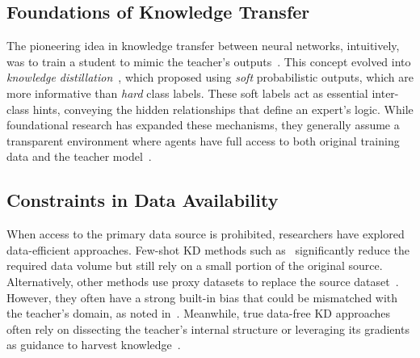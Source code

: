 \subsection{Foundations of Knowledge Transfer} \label{ssec:02-related-kd}
\begin{foldable} %
  The pioneering idea in knowledge transfer between neural networks, intuitively, was to train a student to mimic the teacher's outputs~\cite{bucila2006model}.
  This concept evolved into \textit{knowledge distillation}~\cite{hinton2015distilling}, which proposed using \textit{soft} probabilistic outputs, which are more informative than \textit{hard} class labels.
  These soft labels act as essential inter-class hints, conveying the hidden relationships that define an expert's logic.
  While foundational research has expanded these mechanisms, they generally assume a transparent environment where agents have full access to both original training data and the teacher model~\cite{romero2015fitnets, nguyen2021knowledge}.
\end{foldable}

\subsection{Constraints in Data Availability} \label{ssec:02-related-dfkd}
\begin{foldable} %
  When access to the primary data source is prohibited, researchers have explored data-efficient approaches.
  Few-shot KD methods such as~\cite{wang2020neural, nguyen2022black, vo2024improving} significantly reduce the required data volume but still rely on a small portion of the original source.
  Alternatively, other methods use proxy datasets to replace the source dataset~\cite{chen2021learning, tang2023distribution}.
  However, they often have a strong built-in bias that could be mismatched with the teacher's domain, as noted in~\cite{torralba2011unbiased}.
  Meanwhile, true data-free KD approaches often rely on dissecting the teacher's internal structure or leveraging its gradients as guidance to harvest knowledge~\cite{chen2019data, fang2021contrastive, do2022momentum, tran2024nayer}.
\end{foldable}

